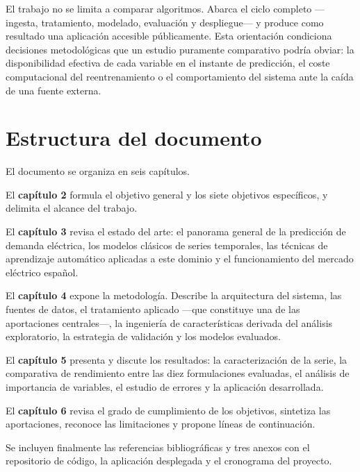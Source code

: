 El trabajo no se limita a comparar algoritmos. Abarca el ciclo completo —ingesta,
tratamiento, modelado, evaluación y despliegue— y produce como resultado una
aplicación accesible públicamente. Esta orientación condiciona decisiones
metodológicas que un estudio puramente comparativo podría obviar: la
disponibilidad efectiva de cada variable en el instante de predicción, el coste
computacional del reentrenamiento o el comportamiento del sistema ante la caída
de una fuente externa.



\section{Estructura del documento}

El documento se organiza en seis capítulos.

El \textbf{capítulo 2} formula el objetivo general y los siete objetivos
específicos, y delimita el alcance del trabajo.

El \textbf{capítulo 3} revisa el estado del arte: el panorama general de la
predicción de demanda eléctrica, los modelos clásicos de series temporales, las
técnicas de aprendizaje automático aplicadas a este dominio y el funcionamiento
del mercado eléctrico español.

El \textbf{capítulo 4} expone la metodología. Describe la arquitectura del
sistema, las fuentes de datos, el tratamiento aplicado —que constituye una de las
aportaciones centrales—, la ingeniería de características derivada del análisis
exploratorio, la estrategia de validación y los modelos evaluados.

El \textbf{capítulo 5} presenta y discute los resultados: la caracterización de
la serie, la comparativa de rendimiento entre las diez formulaciones evaluadas,
el análisis de importancia de variables, el estudio de errores y la aplicación
desarrollada.

El \textbf{capítulo 6} revisa el grado de cumplimiento de los objetivos, sintetiza
las aportaciones, reconoce las limitaciones y propone líneas de continuación.

Se incluyen finalmente las referencias bibliográficas y tres anexos con el
repositorio de código, la aplicación desplegada y el cronograma del proyecto.


